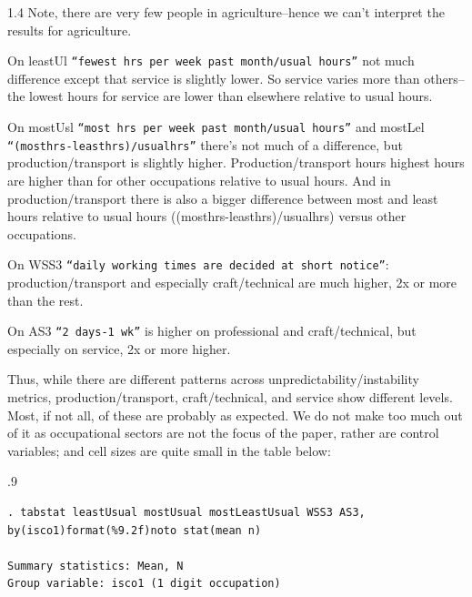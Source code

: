 \documentclass[10pt, letterpaper]{article}
\begin{document}
\begin{spacing}{1.4}
Note, there are very few people in agriculture--hence we can't interpret the results for agriculture.

On leastUl \texttt{``fewest hrs per week past month/usual hours''} not much difference
except that service is slightly lower. So service varies more than others--the
lowest hours for service are lower than elsewhere relative to usual hours. 

On mostUsl  \texttt{``most hrs per week past month/usual hours''}
and  mostLel \texttt{``(mosthrs-leasthrs)/usualhrs''} there's not much of a difference, but production/transport is slightly higher. Production/transport hours highest
hours are higher than for other occupations relative to usual hours. And in
production/transport there is also a bigger difference between most and least
hours relative to usual hours ((mosthrs-leasthrs)/usualhrs) versus other occupations.

On WSS3 \texttt{``daily working times are decided at short notice''}:
production/transport and especially craft/technical are much higher, 2x or more
than the rest.

On AS3 \texttt{``2 days-1 wk''} is higher on professional and craft/technical, but
especially on service, 2x or more higher. 

Thus, while there are different patterns across unpredictability/instability metrics, 
 production/transport,  craft/technical, and  service show different levels. Most, if not all, of these are probably as expected. We do not make too much out of it as occupational sectors are not the focus of the paper, rather are control variables; and cell sizes are quite small in the table below:

\begin{scriptsize}
\begin{spacing}{.9}
\begin{verbatim}
. tabstat leastUsual mostUsual mostLeastUsual WSS3 AS3, by(isco1)format(%9.2f)noto stat(mean n)

Summary statistics: Mean, N
Group variable: isco1 (1 digit occupation)


\end{verbatim}
\end{spacing}
\end{scriptsize}
\end{spacing}
\end{document}
